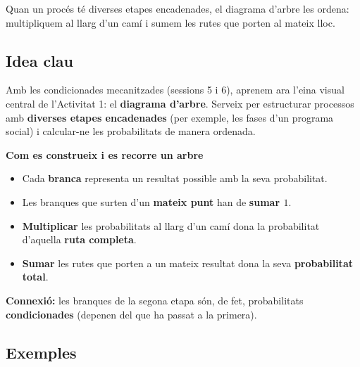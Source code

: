 %
{Quan un procés té diverses etapes encadenades, el diagrama d'arbre les ordena: multipliquem al llarg d'un camí i sumem les rutes que porten al mateix lloc.}

\subsection{Idea clau}

Amb les condicionades mecanitzades (sessions 5 i 6), aprenem ara l'eina visual central
de l'Activitat 1: el \textbf{diagrama d'arbre}. Serveix per estructurar processos amb
\textbf{diverses etapes encadenades} (per exemple, les fases d'un programa social) i
calcular-ne les probabilitats de manera ordenada.

\begin{idea}
\textbf{Com es construeix i es recorre un arbre}
\begin{itemize}[leftmargin=1.4em, itemsep=2pt]
  \item Cada \textbf{branca} representa un resultat possible amb la seva probabilitat.
  \item Les branques que surten d'un \textbf{mateix punt} han de \textbf{sumar $1$}.
  \item \textbf{Multiplicar} les probabilitats al llarg d'un camí dona la probabilitat
        d'aquella \textbf{ruta completa}.
  \item \textbf{Sumar} les rutes que porten a un mateix resultat dona la seva
        \textbf{probabilitat total}.
\end{itemize}
\textbf{Connexió:} les branques de la segona etapa són, de fet, probabilitats
\textbf{condicionades} (depenen del que ha passat a la primera).
\end{idea}

\subsection{Exemples}

